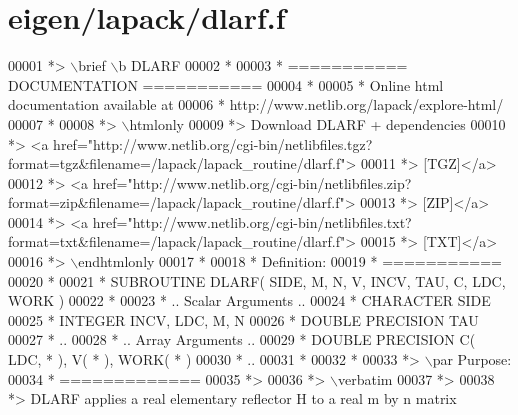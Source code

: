 \hypertarget{eigen_2lapack_2dlarf_8f_source}{}\section{eigen/lapack/dlarf.f}
\label{eigen_2lapack_2dlarf_8f_source}

\begin{DoxyCode}
00001 \textcolor{comment}{*> \(\backslash\)brief \(\backslash\)b DLARF}
00002 \textcolor{comment}{*}
00003 \textcolor{comment}{*  =========== DOCUMENTATION ===========}
00004 \textcolor{comment}{*}
00005 \textcolor{comment}{* Online html documentation available at }
00006 \textcolor{comment}{*            http://www.netlib.org/lapack/explore-html/ }
00007 \textcolor{comment}{*}
00008 \textcolor{comment}{*> \(\backslash\)htmlonly}
00009 \textcolor{comment}{*> Download DLARF + dependencies }
00010 \textcolor{comment}{*> <a
       href="http://www.netlib.org/cgi-bin/netlibfiles.tgz?format=tgz&filename=/lapack/lapack\_routine/dlarf.f"> }
00011 \textcolor{comment}{*> [TGZ]</a> }
00012 \textcolor{comment}{*> <a
       href="http://www.netlib.org/cgi-bin/netlibfiles.zip?format=zip&filename=/lapack/lapack\_routine/dlarf.f"> }
00013 \textcolor{comment}{*> [ZIP]</a> }
00014 \textcolor{comment}{*> <a
       href="http://www.netlib.org/cgi-bin/netlibfiles.txt?format=txt&filename=/lapack/lapack\_routine/dlarf.f"> }
00015 \textcolor{comment}{*> [TXT]</a>}
00016 \textcolor{comment}{*> \(\backslash\)endhtmlonly }
00017 \textcolor{comment}{*}
00018 \textcolor{comment}{*  Definition:}
00019 \textcolor{comment}{*  ===========}
00020 \textcolor{comment}{*}
00021 \textcolor{comment}{*       SUBROUTINE DLARF( SIDE, M, N, V, INCV, TAU, C, LDC, WORK )}
00022 \textcolor{comment}{* }
00023 \textcolor{comment}{*       .. Scalar Arguments ..}
00024 \textcolor{comment}{*       CHARACTER          SIDE}
00025 \textcolor{comment}{*       INTEGER            INCV, LDC, M, N}
00026 \textcolor{comment}{*       DOUBLE PRECISION   TAU}
00027 \textcolor{comment}{*       ..}
00028 \textcolor{comment}{*       .. Array Arguments ..}
00029 \textcolor{comment}{*       DOUBLE PRECISION   C( LDC, * ), V( * ), WORK( * )}
00030 \textcolor{comment}{*       ..}
00031 \textcolor{comment}{*  }
00032 \textcolor{comment}{*}
00033 \textcolor{comment}{*> \(\backslash\)par Purpose:}
00034 \textcolor{comment}{*  =============}
00035 \textcolor{comment}{*>}
00036 \textcolor{comment}{*> \(\backslash\)verbatim}
00037 \textcolor{comment}{*>}
00038 \textcolor{comment}{*> DLARF applies a real elementary reflector H to a real m by n matrix}

\end{DoxyCode}
